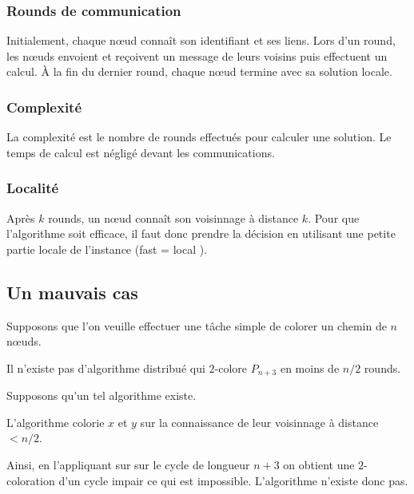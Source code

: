 \subsubsection{Rounds de communication}

Initialement, chaque nœud connaît son identifiant et ses liens. Lors d'un round, les nœuds envoient et reçoivent un message de leurs voisins puis effectuent un calcul. À la fin du dernier round, chaque nœud termine avec sa solution locale.

\subsubsection{Complexité}

La complexité est le nombre de rounds effectués pour calculer une solution. Le temps de calcul est négligé devant les communications.

\subsubsection{Localité}

Après $k$ rounds, un nœud connaît son voisinnage à distance $k$. Pour que l'algorithme soit efficace, il faut donc prendre la décision en utilisant une petite partie locale de l'instance (\og fast = local \fg).

\subsection{Un mauvais cas}

Supposons que l'on veuille effectuer une tâche simple de colorer un chemin de $n$ nœuds.

\begin{center}
	\begin{tikzpicture}
		
	\end{tikzpicture}
\end{center}

Il n'existe pas d'algorithme distribué qui $2$-colore $P_{n + 3}$ en moins de $n / 2$ rounds.

\begin{preuve}
	Supposons qu'un tel algorithme existe.
	
	L'algorithme colorie $x$ et $y$ sur la connaissance de leur voisinnage à distance $< n / 2$.
	
	Ainsi, en l'appliquant sur sur le cycle de longueur $n + 3$ on obtient une $2$-coloration d'un cycle impair ce qui est impossible. L'algorithme n'existe donc pas.
\end{preuve}

